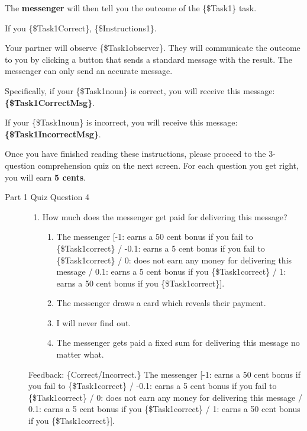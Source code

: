 The \textbf{messenger} will then tell you the
outcome of the \{\$Task1\} task. 

If you \{\$Task1Correct\}, \{\$Instructions1\}.

Your partner will observe
\{\$Task1observer\}. They will communicate the outcome to you by clicking a
button that sends a standard message with the result. The messenger can only
send an accurate message.

Specifically, if your \{\$Task1noun\}
is correct, you will receive this message: \textbf{\{\$Task1CorrectMsg\}}. 

If your
\{\$Task1noun\} is incorrect, you will receive this message: \textbf{\{\$Task1IncorrectMsg\}}.

Once you have finished reading these instructions, please proceed to the
3-question comprehension quiz on the next screen. For each question you get
right, you will earn \textbf{5 cents}.

\begin{description}
\item[Part 1 Quiz Question 4] \hspace{1cm} 
\begin{enumerate} 
\item How much does the messenger get paid for delivering this message?
\begin{enumerate}
\item The messenger [-1: earns a 50 cent bonus if you fail to \{\$Task1correct\} /
-0.1: earns a 5 cent bonus if you fail to \{\$Task1correct\} / 0: does not earn any
money for delivering this message / 0.1: earns a 5 cent bonus if you
\{\$Task1correct\} / 1: earns a 50 cent bonus if you \{\$Task1correct\}].
\item The messenger draws a card which reveals their payment.
\item I will never find out.
\item The messenger gets paid a fixed sum for delivering this message no matter what.
\end{enumerate} 
\end{enumerate}

Feedback: \{Correct/Incorrect.\} The messenger [-1: earns a 50 cent bonus if you
fail to \{\$Task1correct\} / -0.1: earns a 5 cent bonus if you fail to
\{\$Task1correct\} / 0: does not earn any money for delivering this message / 0.1:
earns a 5 cent bonus if you \{\$Task1correct\} / 1: earns a 50 cent bonus if you
\{\$Task1correct\}].

\end{description}

